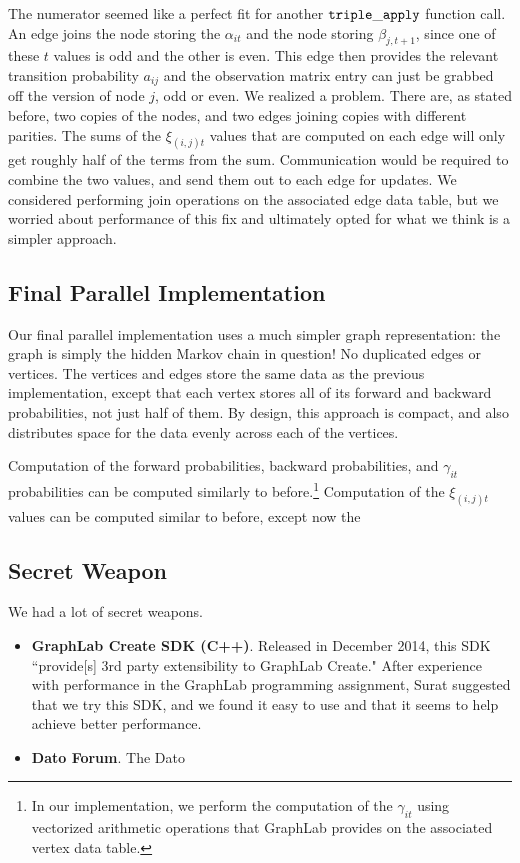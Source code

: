 The numerator seemed like a perfect fit for another $\tt{triple\_apply}$ function call.  An edge joins the node storing the $\alpha_{it}$ and the node storing $\beta_{j, t+1}$, since one of these $t$ values is odd and the other is even.  This edge then provides the relevant transition probability $a_{ij}$ and the observation matrix entry can just be grabbed off the version of node $j$, odd or even.  We realized a problem. There are, as stated before, two copies of the nodes, and two edges joining copies with different parities.  The sums of the $\xi_{(i,j)t}$ values that are computed on each edge will only get roughly half of the terms from the sum.  Communication would be required to combine the two values, and send them out to each edge for updates.  We considered performing join operations on the associated edge data table, but we worried about performance of this fix and ultimately opted for what we think is a simpler approach.

\subsection{Final Parallel Implementation}

Our final parallel implementation uses a much simpler graph representation: the graph is simply the hidden Markov chain in question! No duplicated edges or vertices.  The vertices and edges store the same data as the previous implementation, except that each vertex stores all of its forward and backward probabilities, not just half of them.  By design, this approach is compact, and also distributes space for the data evenly across each of the vertices.

Computation of the forward probabilities, backward probabilities, and $\gamma_{it}$ probabilities can be computed similarly to before.\footnote{In our implementation, we perform the computation of the $\gamma_{it}$ using vectorized arithmetic operations that GraphLab provides on the associated vertex data table.}  Computation of the $\xi_{(i, j)t}$ values can be computed similar to before, except now the 

\subsection{Secret Weapon}

We had a lot of secret weapons. 

\begin{itemize}
\item \textbf{GraphLab Create SDK (C++)}.  Released in December 2014, this SDK ``provide[s] 3rd party extensibility to GraphLab Create."  After experience with performance in the GraphLab programming assignment, Surat suggested that we try this SDK, and we found it easy to use and that it seems to help achieve better performance.

\item \textbf{Dato Forum}.  The Dato
\end{itemize}
